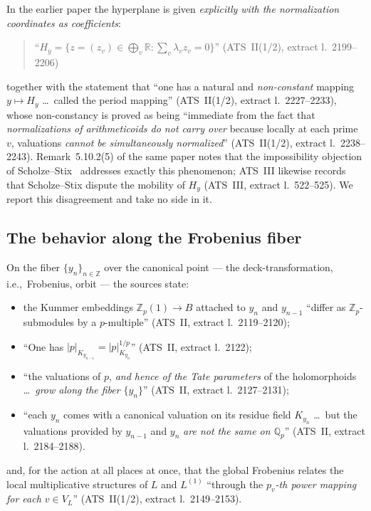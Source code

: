 \documentclass[11pt,a4paper]{article}
\theoremstyle{definition}
\theoremstyle{plain}
\theoremstyle{definition}
\newcommand{\anchor}[2]{(#1, extract l.~#2)}
\begin{document}
In the earlier paper the hyperplane is given \emph{explicitly with the
normalization coordinates as coefficients}:

\begin{quote}\small
``$H_y = \{ z = (z_v) \in \bigoplus_v \mathbb{R} : \sum_v \lambda_v z_v = 0 \}$''
\hfill\anchor{ATS~II(1/2)}{2199--2206}
\end{quote}

together with the statement that ``one has a natural and \emph{non-constant}
mapping $y \mapsto H_y$ \ldots\ called the period mapping''
\anchor{ATS~II(1/2)}{2227--2233}, whose non-constancy is proved as being
``immediate from the fact that \emph{normalizations of arithmeticoids do not carry
over} because locally at each prime $v$, valuations \emph{cannot be simultaneously
normalized}'' \anchor{ATS~II(1/2)}{2238--2243}. Remark~5.10.2(5) of the same paper
notes that the impossibility objection of Scholze--Stix~\cite{ScholzeStix2018}
addresses exactly this phenomenon; ATS~III likewise records that Scholze--Stix
dispute the mobility of $H_y$ \anchor{ATS~III}{522--525}. We report this
disagreement and take no side in it.

\subsection{The behavior along the Frobenius fiber}

On the fiber $\{y_n\}_{n \in \mathbb{Z}}$ over the canonical point --- the
deck-transformation, i.e.,\ Frobenius, orbit --- the sources state:

\begin{itemize}
\item the Kummer embeddings $\mathbb{Z}_p(1) \to B$ attached to $y_n$ and
  $y_{n-1}$ ``differ as $\mathbb{Z}_p$-submodules by a $p$-multiple''
  \anchor{ATS~II}{2119--2120};
\item ``One has $|p|_{K_{y_{n-1}}} = |p|^{1/p}_{K_{y_n}}$''
  \anchor{ATS~II}{2122};
\item ``the valuations of $p$, \emph{and hence of the Tate parameters} of the
  holomorphoids \ldots\ \emph{grow along the fiber} $\{y_n\}$''
  \anchor{ATS~II}{2127--2131};
\item ``each $y_n$ comes with a canonical valuation on its residue field
  $K_{y_n}$ \ldots\ but the valuations provided by $y_{n-1}$ and $y_n$ \emph{are
  not the same on $\mathbb{Q}_p$}'' \anchor{ATS~II}{2184--2188}.
\end{itemize}

and, for the action at all places at once, that the global Frobenius relates the
local multiplicative structures of $L$ and $L^{(1)}$ ``through the \emph{$p_v$-th
power mapping for each $v \in V_L$}'' \anchor{ATS~II(1/2)}{2149--2153}.
\end{document}
